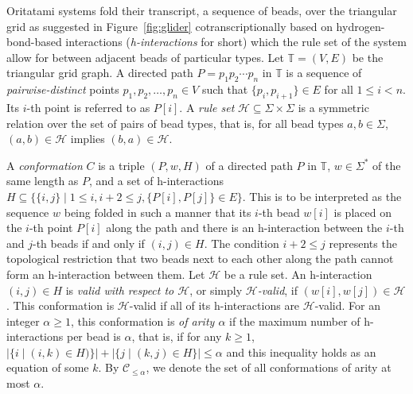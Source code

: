 \documentclass{article}
\theoremstyle{remark}
\begin{document}
Oritatami systems fold their transcript, a sequence of beads, over the triangular grid as suggested in Figure~\ref{fig:glider} cotranscriptionally based on hydrogen-bond-based interactions (\textit{h-interactions} for short) which the rule set of the system allow for between adjacent beads of particular types. 
Let $\mathbb{T} = (V, E)$ be the triangular grid graph. 
A directed path $P = p_1 p_2 \cdots p_n$ in $\mathbb{T}$ is a sequence of \textit{pairwise-distinct} points $p_1, p_2, \ldots, p_n \in V$ such that $\{p_i, p_{i+1}\} \in E$ for all $1 \leq i < n$.
Its $i$-th point is referred to as $P[i]$. 
A \textit{rule set} $\mathcal{H} \subseteq \Sigma \times \Sigma$ is a symmetric relation over the set of pairs of bead types, that is, for all bead types $a, b \in \Sigma$, $(a, b) \in \mathcal{H}$ implies $(b, a) \in \mathcal{H}$. 

A \textit{conformation} $C$ is a triple $(P, w, H)$ of a directed path $P$ in $\mathbb{T}$, $w \in \Sigma^*$ of the same length as $P$, and a set of h-interactions $H \subseteq \{\{i,j\} \mid 1 \leq i, i+2 \leq j, \{P[i], P[j]\} \in E\}$.
This is to be interpreted as the sequence $w$ being folded in such a manner that its $i$-th bead $w[i]$ is placed on the $i$-th point $P[i]$ along the path and there is an h-interaction between the $i$-th and $j$-th beads if and only if $(i, j) \in H$. 
The condition $i+2 \leq j$ represents the topological restriction that two beads next to each other along the path cannot form an h-interaction between them.
Let $\mathcal{H}$ be a rule set. 
An h-interaction $(i, j) \in H$ is \textit{valid with respect to $\mathcal{H}$}, or simply \textit{$\mathcal{H}$-valid}, if $(w[i], w[j]) \in \mathcal{H}$. 
This conformation is $\mathcal{H}$-valid if all of its h-interactions are $\mathcal{H}$-valid. 
For an integer $\alpha \ge 1$, this conformation is \textit{of arity $\alpha$} if the maximum number of h-interactions per bead is $\alpha$, that is, if for any $k \ge 1$, $|\{i \mid (i, k) \in H)\}| + |\{j \mid (k, j) \in H\}| \le \alpha$ and this inequality holds as an equation of some $k$. 
By $\mathcal{C}_{\le \alpha}$, we denote the set of all conformations of arity at most $\alpha$.
\end{document}
